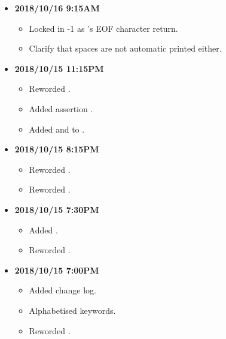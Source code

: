 \documentclass[../gazprea.tex]{subfiles}
\begin{document}
\begin{itemize}
  \item
    \textbf{2018/10/16 9:15AM}
    \begin{itemize}
      \item Locked in -1 as 's EOF character return.
      \item Clarify that spaces are not automatic printed either.
    \end{itemize}
  \item
    \textbf{2018/10/15 11:15PM}
    \begin{itemize}
      \item Reworded .
      \item Added assertion .
      \item Added  and  to .
    \end{itemize}
  \item
    \textbf{2018/10/15 8:15PM}
    \begin{itemize}
      \item Reworded .
      \item Reworded .
    \end{itemize}
  \item
    \textbf{2018/10/15 7:30PM}
    \begin{itemize}
      \item Added .
      \item Reworded .
    \end{itemize}
  \item
    \textbf{2018/10/15 7:00PM}
    \begin{itemize}
      \item Added change log.
      \item Alphabetised keywords.
      \item Reworded .
    \end{itemize}
\end{itemize}
\end{document}
